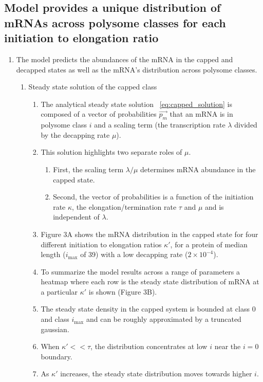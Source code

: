 \documentclass[review]{elsarticle}
\newcommand{\imax}{\ensuremath{{i_{\max}}}\xspace}
\begin{document}
\subsection{Model provides a unique distribution of mRNAs across polysome classes for each initiation to elongation ratio}
\begin{enumerate}
\item The model predicts the abundances of the mRNA in the capped and decapped states as well as the mRNA's distribution across polysome classes.
\begin{enumerate}
  \item Steady state solution of the capped class
  \begin{enumerate}
    \item The analytical steady state solution ~\ref{eq:capped_solution} is composed of a vector of probabilities $\vec{p_m}$ that an mRNA is in polysome class $i$ and a scaling term (the transcription rate $\lambda$ divided by the decapping rate $\mu$). 
    \item This solution highlights two separate roles of $\mu$.
    \begin{enumerate}
      \item First, the scaling term $\lambda / \mu$ determines mRNA abundance in the capped state.
      \item Second, the vector of probabilities is a function of the initiation rate $\kappa$, the elongation/termination rate $\tau$ and $\mu$ and is independent of $\lambda$.
    \end{enumerate} 
    \item Figure 3A shows the mRNA distribution in the capped state for four different initiation to elongation ratios $\kappa'$, for a protein of median length (\imax of 39) with a low decapping rate ($2\times10^{-4}$).
    \item To summarize the model results across a range of parameters a heatmap where each row is the steady state distribution of mRNA at a particular $\kappa'$ is shown (Figure 3B).
    \item  The steady state density in the capped system is bounded at class 0 and class \imax and can be roughly approximated by a truncated gaussian. 
    \item When $\kappa'<<\tau$, the distribution concentrates at low $i$ near the $i=0$ boundary.
    \item As $\kappa'$ increases, the steady state distribution moves towards higher $i$.
     \end{enumerate}

\end{enumerate}
\end{enumerate}
\end{document}
